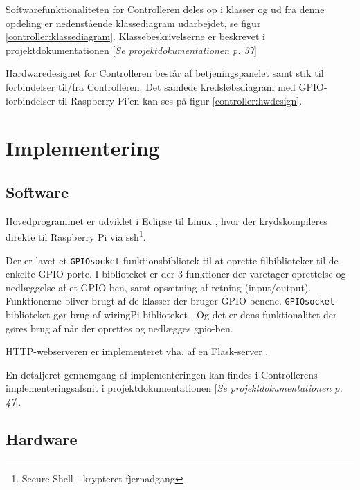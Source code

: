 Softwarefunktionaliteten for Controlleren deles op i klasser og ud fra denne opdeling er nedenstående klassediagram udarbejdet, se figur \ref{controller:klassediagram}. Klassebeskrivelserne er beskrevet i projektdokumentationen [\textit{Se projektdokumentationen p. 37}]


Hardwaredesignet for Controlleren består af betjeningspanelet samt stik til forbindelser til/fra Controlleren. Det samlede kredsløbsdiagram med GPIO-forbindelser til Raspberry Pi'en kan ses på figur \ref{controller:hwdesign}.


\section{Implementering}
\label{ctrl_implementering}

\subsection*{Software}

Hovedprogrammet er udviklet i Eclipse til Linux \citep{website:eclipsekepler}, hvor der krydskompileres direkte til Raspberry Pi via ssh\footnote{Secure Shell - krypteret fjernadgang}.

Der er lavet et \verb+GPIOsocket+ funktionsbibliotek til at oprette filbiblioteker til de enkelte GPIO-porte. I biblioteket er der 3 funktioner der varetager oprettelse og nedlæggelse af et GPIO-ben, samt opsætning af retning (input/output). Funktionerne bliver brugt af de klasser der bruger GPIO-benene. \verb+GPIOsocket+ biblioteket gør brug af wiringPi biblioteket \citep{website:wiringpi}. Og det er dens funktionalitet der gøres brug af når der oprettes og nedlægges gpio-ben.

HTTP-webserveren er implementeret vha. af en Flask-server \citep{website:flask}.

En detaljeret gennemgang af implementeringen kan findes i Controllerens implementeringsafsnit i projektdokumentationen [\textit{Se projektdokumentationen p. 47}].

\subsection*{Hardware}

